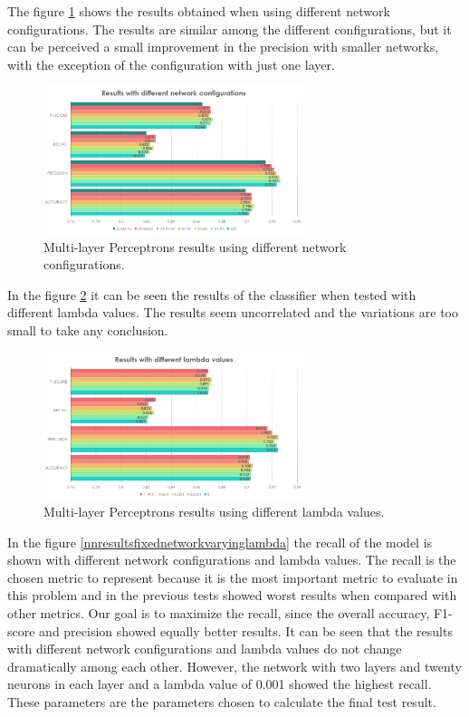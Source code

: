 \documentclass[journal]{IEEEtran}
\begin{document}
The figure \ref{nnresultsvaryingnetwork} shows the results obtained when using different network configurations. The results are similar among the different configurations, but it can be perceived a small improvement in the precision with smaller networks, with the exception of the configuration with just one layer.

\begin{figure}[!t]
\centering
\includegraphics[width=3in]{nn1_w}
\caption{Multi-layer Perceptrons results using different network configurations.}
\label{nnresultsvaryingnetwork}
\end{figure}

In the figure \ref{nnresultsvaryinglambda} it can be seen the results of the classifier when tested with different lambda values. The results seem uncorrelated and the variations are too small to take any conclusion.

\begin{figure}[!t]
\centering
\includegraphics[width=3in]{nn2_w}
\caption{Multi-layer Perceptrons results using different lambda values.}
\label{nnresultsvaryinglambda}
\end{figure}

In the figure \ref{nnresultsfixednetworkvaryinglambda} the recall of the model is shown with different network configurations and lambda values. The recall is the chosen metric to represent because it is the most important metric to evaluate in this problem and in the previous tests showed worst results when compared with other metrics. Our goal is to maximize the recall, since the overall accuracy, F1-score and precision showed equally better results. It can be seen that the results with different network configurations and lambda values do not change dramatically among each other. However, the network with two layers and twenty neurons in each layer and a lambda value of 0.001 showed the highest recall. These parameters are the parameters chosen to calculate the final test result.
\end{document}
